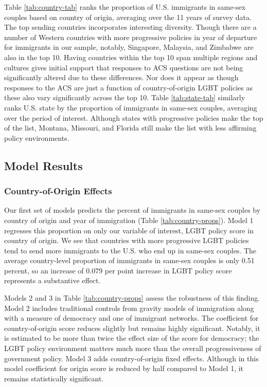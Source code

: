 \documentclass[
  11pt,
]{article}
\begin{document}
Table \ref{tab:country-tab} ranks the proportion of U.S. immigrants in same-sex couples based on country of origin, averaging over the 11 years of survey data. The top sending countries incorporates interesting diversity. Though there are a number of Western countries with more progressive policies in year of departure for immigrants in our sample, notably, Singapore, Malaysia, and Zimbabwe are also in the top 10. Having countries within the top 10 span multiple regions and cultures gives initial support that responses to ACS questions are not being significantly altered due to these differences. Nor does it appear as though responses to the ACS are just a function of country-of-origin LGBT policies as these also vary significantly across the top 10. Table \ref{tab:state-tab} similarly ranks U.S. state by the proportion of immigrants in same-sex couples, averaging over the period of interest. Although states with progressive policies make the top of the list, Montana, Missouri, and Florida still make the list with less affirming policy environments.

\hypertarget{model-results}{%
\subsection{Model Results}\label{model-results}}

\hypertarget{country-of-origin-effects}{%
\subsubsection{Country-of-Origin Effects}\label{country-of-origin-effects}}

Our first set of models predicts the percent of immigrants in same-sex couples by country of origin and year of immigration (Table \ref{tab:country-props}). Model 1 regresses this proportion on only our variable of interest, LGBT policy score in country of origin. We see that countries with more progressive LGBT policies tend to send more immigrants to the U.S. who end up in same-sex couples. The average country-level proportion of immigrants in same-sex couples is only 0.51 percent, so an increase of 0.079 per point increase in LGBT policy score represents a substantive effect.

Models 2 and 3 in Table \ref{tab:country-props} assess the robustness of this finding. Model 2 includes traditional controls from gravity models of immigration along with a measure of democracy and one of immigrant networks. The coefficient for country-of-origin score reduces slightly but remains highly significant. Notably, it is estimated to be more than twice the effect size of the score for democracy; the LGBT policy environment matters much more than the overall progressiveness of government policy. Model 3 adds country-of-origin fixed effects. Although in this model coefficient for origin score is reduced by half compared to Model 1, it remains statistically significant.
\end{document}
